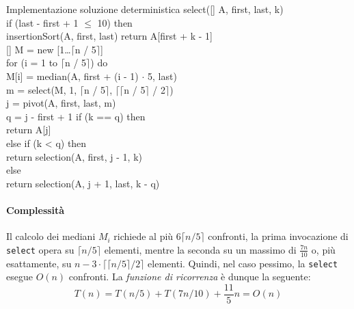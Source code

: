 \newpage
\begin{minicode}{Implementazione soluzione deterministica}
\ind{} select([] A,  first,  last,  k)\\
    \indf if (last - first + 1 $\leq$ 10) then\\
        insertionSort(A, first, last)\hfill{}
        return A[first + k - 1]\\
    \indf{}
    \indf{}[] M = new [1\dots$\lceil$n / 5$\rceil$]\\
    \indf for (i = 1 to $\lceil$n / 5$\rceil$) do\\
        M[i] = median(A, first + (i - 1) $\cdot$ 5, last)\\
    \indf{}
    \indf{} m = select(M, 1, $\lceil$n / 5$\rceil$, $\lceil\lceil$n / 5$\rceil$ / 2$\rceil$)\\
    \indf{} j = pivot(A, first, last, m)\\
    \indf{} q = j - first + 1\hfill{}
    \indf if (k == q) then\\
        return A[j]\\
    \indf else if (k < q) then\\
        return selection(A, first, j - 1, k)\\
    \indf else\\
        return selection(A, j + 1, last, k - q)
\end{minicode}

\paragraph{Complessità}
Il calcolo dei mediani $M_i$ richiede al più $6\lceil n/5\rceil$ confronti, la
prima invocazione di \texttt{select} opera su $\lceil n/5\rceil$ elementi, mentre
la seconda su un massimo di $\frac{7n}{10}$ o, più esattamente, su $n-3\cdot\lceil
\lceil n/5\rceil/2\rceil$ elementi. Quindi, nel caso pessimo, la \texttt{select}
esegue $O(n)$ confronti. La \emph{funzione di ricorrenza} è dunque la seguente:
\[T(n)=T(n/5)+T(7n/10)+\frac{11}{5}n=O(n)\]